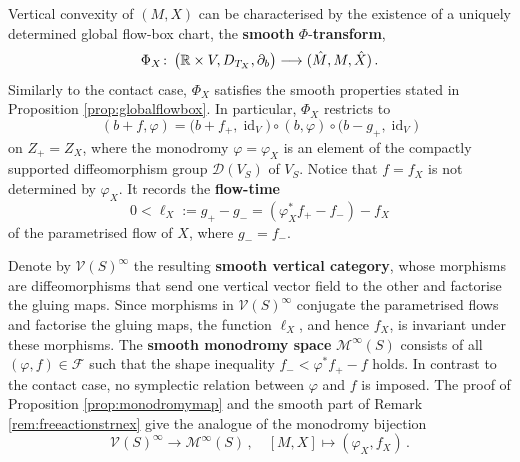 \documentclass{amsart}
\theoremstyle{definition}
\def\co{\colon\thinspace}
\newcommand{\DD}{\mathcal D}
\newcommand{\FF}{\mathcal F}
\newcommand{\MM}{\mathcal M}
\newcommand{\R}{\mathbb R}
\newcommand{\VV}{\mathcal V}
\newcommand{\lra}{\longrightarrow}
\DeclareMathOperator{\id}{\mathrm{id}}
\begin{document}
Vertical convexity of $(M,X)$
can be characterised by the existence
of a uniquely determined global flow-box chart,
the {\bf smooth} $\Phi$-{\bf transform},
\[
\Phi_X\co
\big(\R\times V,D_{T_X},\partial_b\big)
\lra
(\hat{M},M,\hat{X})
\,.
\]
Similarly to the contact case,
$\Phi_X$ satisfies the smooth properties
stated in Proposition \ref{prop:globalflowbox}.
In particular, $\Phi_X$ restricts to
\[
(b+f,\varphi)=
\big(b+f_+,\id_V\!\big)
\circ
(b,\varphi)
\circ
\big(b-g_+,\id_V\!\big)
\]
on $Z_+=Z_X$,
where the monodromy $\varphi=\varphi_X$ is an element
of the compactly supported diffeomorphism group
$\DD(V_S)$ of $V_S$.
Notice that $f=f_X$ is not determined by $\varphi_X$.
It records the {\bf flow-time}
\[
0<
\ell_X:=g_+-g_-=
(\varphi_X^*f_+-f_-)-f_X
\]
of the parametrised flow of $X$,
where $g_-=f_-$.

Denote by $\VV(S)^{\infty}$
the resulting {\bf smooth vertical category},
whose morphisms are diffeomorphisms
that send one vertical vector field to the other
and factorise the gluing maps.
Since morphisms in $\VV(S)^{\infty}$
conjugate the parametrised flows
and factorise the gluing maps,
the function $\ell_X$, and hence $f_X$,
is invariant under these morphisms.
The {\bf smooth monodromy space} $\MM^{\infty}(S)$
consists of all $(\varphi,f)\in\FF$
such that the shape inequality $f_-<\varphi^*f_+-f$ holds.
In contrast to the contact case,
no symplectic relation between $\varphi$ and $f$
is imposed.
The proof of Proposition \ref{prop:monodromymap}
and the smooth part of
Remark \ref{rem:freeactionstrnex}
give the analogue of the monodromy bijection
\[
\VV(S)^{\infty}\lra\MM^{\infty}(S)
\,,
\quad
[M,X]\longmapsto(\varphi_X,f_X)
\,.
\]
\end{document}
